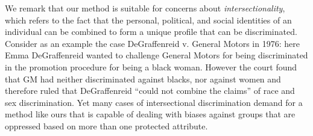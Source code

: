 %
%
%
%
%
%


We remark that our method is suitable for concerns about \emph{intersectionality}, which refers to the fact that \textcolor[rgb]{0.00,0.00,1.00}{the personal}, political, and social identities \textcolor[rgb]{0.00,0.00,1.00}{of an individual can be combined to form a unique profile that can be discriminated}.
%
Consider as an example the case DeGraffenreid v. General Motors in 1976: here Emma DeGraffenreid wanted to challenge General Motors for being discriminated in the promotion procedure for being a black woman.
%
However the court found that GM had neither discriminated against blacks, nor against women and therefore ruled that DeGraffenreid ``could not combine the claims'' of race and sex discrimination.
%
Yet many cases of intersectional discrimination demand for a method like ours that is capable of dealing with biases against groups that are oppressed based on more than one protected \textcolor[rgb]{0.00,0.00,1.00}{attribute}.

